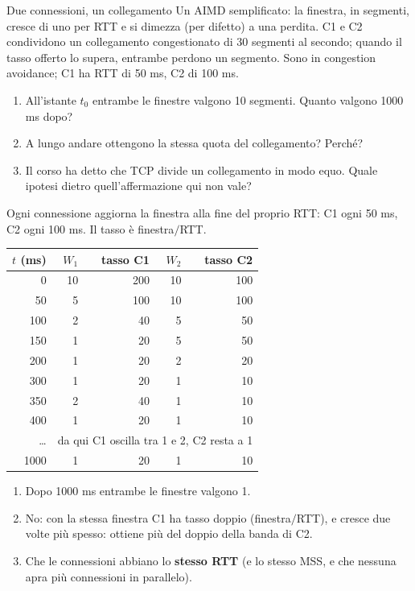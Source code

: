\begin{esercizio}{Due connessioni, un collegamento}
Un AIMD semplificato: la finestra, in segmenti, cresce di uno per RTT e si dimezza (per difetto) a una perdita. C1 e C2 condividono un
collegamento congestionato di 30 segmenti al secondo; quando il tasso offerto lo supera, entrambe perdono un segmento. Sono in congestion
avoidance; C1 ha RTT di 50 ms, C2 di 100 ms.
\begin{enumerate}[label=(\alph*)]
    \item All'istante $t_0$ entrambe le finestre valgono 10 segmenti. Quanto valgono 1000 ms dopo?
    \item A lungo andare ottengono la stessa quota del collegamento? Perché?
    \item Il corso ha detto che TCP divide un collegamento in modo equo. Quale ipotesi dietro quell'affermazione qui non vale?
\end{enumerate}

\svolgimento
Ogni connessione aggiorna la finestra alla fine del proprio RTT: C1 ogni 50 ms, C2 ogni 100 ms. Il tasso è finestra$/$RTT.
\begin{center}
\small
\begin{tabular}{rrrrr}
\toprule
$t$ (ms) & $W_1$ & tasso C1 & $W_2$ & tasso C2 \\
\midrule
0 & 10 & 200 & 10 & 100 \\
50 & 5 & 100 & 10 & 100 \\
100 & 2 & 40 & 5 & 50 \\
150 & 1 & 20 & 5 & 50 \\
200 & 1 & 20 & 2 & 20 \\
300 & 1 & 20 & 1 & 10 \\
350 & 2 & 40 & 1 & 10 \\
400 & 1 & 20 & 1 & 10 \\
\dots & \multicolumn{4}{c}{da qui C1 oscilla tra 1 e 2, C2 resta a 1} \\
1000 & 1 & 20 & 1 & 10 \\
\bottomrule
\end{tabular}
\end{center}
\begin{enumerate}[label=(\alph*)]
    \item Dopo 1000 ms entrambe le finestre valgono 1.
    \item No: con la stessa finestra C1 ha tasso doppio (finestra$/$RTT), e cresce due volte più spesso: ottiene più del doppio della banda
          di C2.
    \item Che le connessioni abbiano lo \textbf{stesso RTT} (e lo stesso MSS, e che nessuna apra più connessioni in parallelo).
\end{enumerate}
\end{esercizio}

